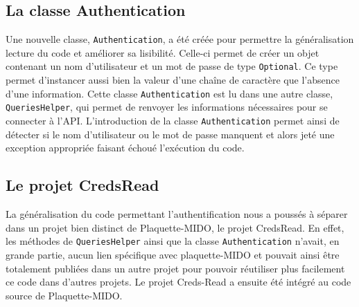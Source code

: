 \subsection{La classe Authentication}

Une nouvelle classe, \texttt{Authentication}, a été créée pour permettre la généralisation lecture du code et améliorer sa lisibilité. Celle-ci permet de créer un objet contenant un nom d'utilisateur et un mot de passe de type \texttt{Optional}. Ce type permet d'instancer aussi bien la valeur d'une chaîne de caractère que l'absence d'une information. Cette classe \texttt{Authentication} est lu dans une autre classe, \texttt{QueriesHelper}, qui permet de renvoyer les informations nécessaires pour se connecter à l'API. L'introduction de la classe \texttt{Authentication} permet ainsi de détecter si le nom d'utilisateur ou le mot de passe manquent et alors jeté une exception appropriée faisant échoué l'exécution du code. 

\subsection{Le projet CredsRead}
La généralisation du code permettant l'authentification nous a poussés à séparer dans un projet bien distinct de Plaquette-MIDO, le projet CredsRead. En effet, les méthodes de \texttt{QueriesHelper} ainsi que la classe \texttt{Authentication} n'avait, en grande partie, aucun lien spécifique avec plaquette-MIDO et pouvait ainsi être totalement publiées dans un autre projet pour pouvoir réutiliser plus facilement ce code dans d'autres projets. Le projet Creds-Read a ensuite été intégré au code source de Plaquette-MIDO.